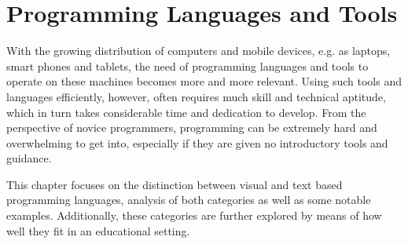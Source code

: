 \chapter{Programming Languages and Tools}
\label{chap:languages_and_tools}

With the growing distribution of computers and mobile devices, e.g. as laptops, smart phones and tablets, the need of programming languages and tools to operate on these machines becomes more and more relevant. Using such tools and languages efficiently, however, often requires much skill and technical aptitude, which in turn takes considerable time and dedication to develop. From the perspective of novice programmers, programming can be extremely hard and overwhelming to get into, especially if they are given no introductory tools and guidance.

This chapter focuses on the distinction between visual and text based programming languages, analysis of both categories as well as some notable examples. Additionally, these categories are further explored by means of how well they fit in an educational setting.   


